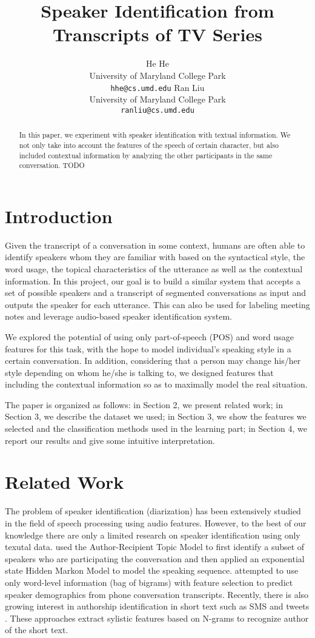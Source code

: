 \documentclass[11pt,letterpaper]{article}
\title{Speaker Identification from Transcripts of TV Series}%
\author{He He\\
	University of Maryland College Park\\
	    {\tt hhe@cs.umd.edu}
	  \And
	Ran Liu\\
  	University of Maryland College Park\\
  {\tt ranliu@cs.umd.edu}}
\date{}
\begin{document}
\maketitle
\begin{abstract}
In this paper, we experiment with speaker identification with textual information. We not only take into account the features of the speech of certain character, but also included contextual information by analyzing  the other participants in the same conversation. 
TODO
\end{abstract}

\section{Introduction}
Given the transcript of a conversation in some context, 
humans are often able to identify speakers whom they are familiar with 
based on the syntactical style, the word usage, the topical characteristics of the utterance 
as well as the contextual information.
In this project, our goal is to build a similar system that accepts a set of possible speakers and 
a transcript of segmented conversations as input and outputs the speaker for each utterance.
This can also be used for labeling meeting notes and leverage audio-based speaker identification system.

We explored the potential of using only part-of-speech (POS) and word usage features
for this task, with the hope to model individual's speaking style in a certain conversation.
In addition, considering that a person may change his/her style depending on whom he/she is talking to,
we designed features that including the contextual information so as to maximally model the real situation.

The paper is organized as follows: in Section 2, we present related work; in Section 3, we describe
the dataset we used; in Section 3, we show the features we selected and the classification
methods used in the learning part; in Section 4, we report our results and give some intuitive interpretation.

\section{Related Work}
The problem of speaker identification (diarization) has been extensively studied in the field of speech processing using audio features. However, to the best of our knowledge 
there are only a limited research on speaker identification using only texutal data. 
\cite{Chaudhuri:11} used the Author-Recipient Topic Model \cite{McCallum:07} to first identify
a subset of speakers who are participating the conversation and then applied an exponential state
Hidden Markon Model to model the speaking sequence. \cite{Gillick:10} attempted to use only word-level
information (bag of bigrams) with feature selection to predict speaker demographics from phone
conversation transcripts. Recently, there is also growing interest in authorship identification in
short text such as SMS \cite{Mohan:11} and tweets \cite{Sousa-Silva:11}. These approaches extract
sylistic features based on N-grams to recognize author of the short text.
\end{document}
